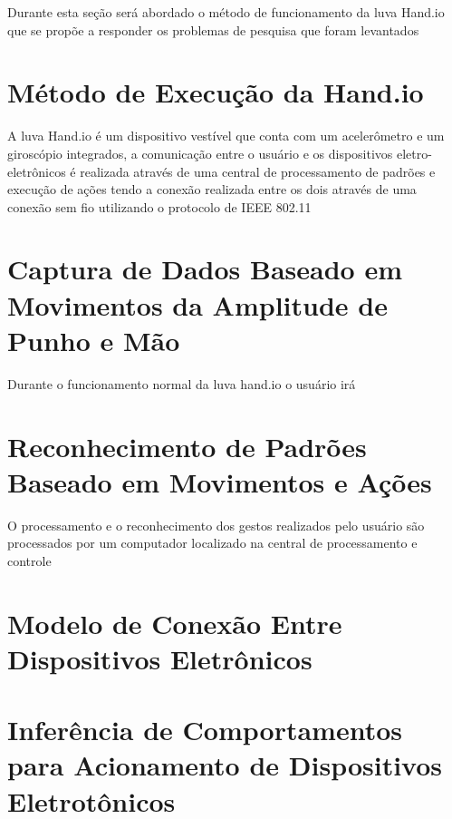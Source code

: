 Durante esta seção será abordado o método de funcionamento da luva Hand.io que se propõe a responder os problemas de pesquisa que foram levantados 

\section{Método de Execução da Hand.io}



A luva Hand.io é um dispositivo vestível que conta com um acelerômetro e um giroscópio integrados, a comunicação entre o usuário e os dispositivos eletro-eletrônicos é realizada através de uma central de processamento de padrões e execução de ações tendo a conexão realizada entre os dois através de uma conexão sem fio utilizando o protocolo de IEEE 802.11 \cite{802.11:1997}









\section{Captura de Dados Baseado em Movimentos da 
Amplitude de Punho e Mão}

Durante o funcionamento normal da luva hand.io o usuário irá 

\section{Reconhecimento de Padrões Baseado em Movimentos e Ações}

O processamento e o reconhecimento dos gestos realizados pelo usuário são processados por um computador localizado na central de processamento e controle

\section{Modelo de Conexão Entre Dispositivos Eletrônicos}

\section{Inferência de Comportamentos para Acionamento de Dispositivos Eletrotônicos}

